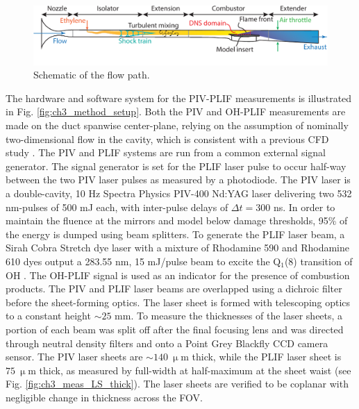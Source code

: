 \begin{figure}[!hbt]
\centering
\includegraphics[width=6.5in]{figures/PIV-PLIFsetup/pivplifSmallcavity-crop.pdf} %
\caption{Schematic of the flow path.}\label{fig:ch3_flowpath}
\end{figure}

The hardware and software system for the PIV-PLIF measurements is illustrated in Fig. \ref{fig:ch3_method_setup}. 
Both the PIV and OH-PLIF measurements are made on the duct spanwise center-plane, relying on the assumption of nominally two-dimensional flow in the cavity, which is consistent with a previous CFD study \cite{ramesh2015large}. The PIV and PLIF systems are run from a common external signal generator. The signal generator is set for the PLIF laser pulse to occur half-way between the two PIV laser pulses as measured by a photodiode. 
The PIV laser is a double-cavity, 10 Hz Spectra Physics PIV-400 Nd:YAG laser delivering two 532 nm-pulses of 500 mJ each, with inter-pulse delays of $\Delta t = 300$ ns. In order to maintain the fluence at the mirrors and model below damage thresholds, 95\% of the energy is dumped using beam splitters. To generate the PLIF laser beam, a Sirah Cobra Stretch dye laser with a mixture of Rhodamine 590 and Rhodamine 610 dyes output a 283.55 nm, 15 mJ/pulse beam to excite the Q$_1$(8) transition of OH \citep{GeipelRockwellChelliahEtAl2017}. The OH-PLIF signal is used as an indicator for the presence of combustion products. The PIV and PLIF laser beams are overlapped using a dichroic filter before the sheet-forming optics. The laser sheet is formed with telescoping optics to a constant height $\sim 25$ mm. To measure the thicknesses of the laser sheets, a portion of each beam was split off after the final focusing lens and was directed through neutral density filters and onto a Point Grey Blackfly CCD camera sensor. The PIV laser sheets are $\sim 140~ \mathrm{\upmu m}$ thick, while the PLIF laser sheet is $75~ \mathrm{\upmu m}$ thick, as measured by full-width at half-maximum at the sheet waist (see Fig. \ref{fig:ch3_meas_LS_thick}). The laser sheets are verified to be coplanar with negligible change in thickness across the FOV.
